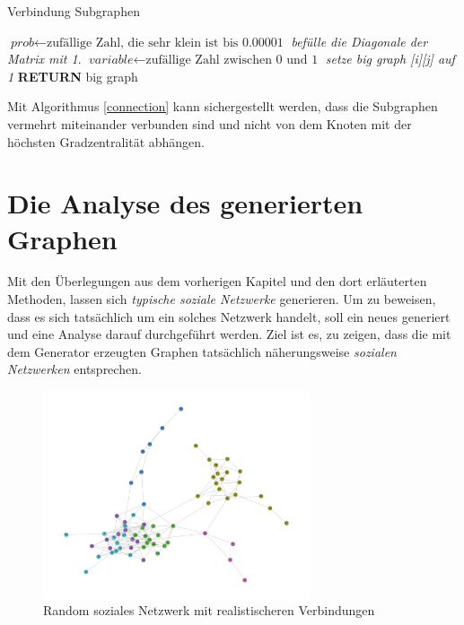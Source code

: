 \begin{algorithm}
\caption{Verbindung Subgraphen}\label{connection}
\begin{algorithmic}[1]
\State $\textit{prob} \gets \text{zufällige Zahl, die sehr klein ist bis 0.00001}$
\State \textit{befülle die Diagonale der Matrix mit 1}.
\EndFor
{}
\State $\textit{variable} \gets \text{zufällige Zahl zwischen 0 und 1}$
\State \textit{setze big graph [i][j] auf 1}
\EndIf
\EndFor
\EndFor
\textbf{RETURN} big graph
\EndProcedure
\end{algorithmic}
\end{algorithm}

Mit Algorithmus \ref{connection} kann sichergestellt werden, dass die Subgraphen vermehrt miteinander verbunden sind und nicht von dem Knoten mit der höchsten Gradzentralität abhängen.

\section{Die Analyse des generierten Graphen}
Mit den Überlegungen aus dem vorherigen Kapitel und den dort erläuterten Methoden, lassen sich \textit{typische soziale Netzwerke} generieren. Um zu beweisen, dass es sich tatsächlich um ein solches Netzwerk handelt, soll ein neues generiert und eine Analyse darauf durchgeführt werden. Ziel ist es, zu zeigen, dass die mit dem Generator erzeugten Graphen tatsächlich näherungsweise \textit{sozialen Netzwerken} entsprechen.

\FloatBarrier
\begin{figure}[h!]
    \centering
    \hspace*{-2cm}
    \includegraphics[width=0.7\textwidth]{Graphics/Random_moreConnections.jpg}
    \caption{Random soziales Netzwerk mit realistischeren Verbindungen}
    \label{fig:SNA}
\end{figure}

